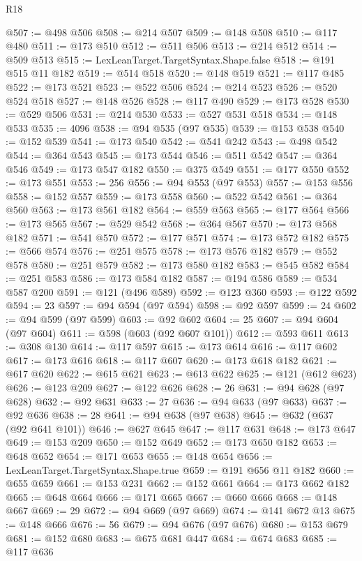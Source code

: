 \begin{lexlean}{R18}
\begin{coremodule}
@507 := @498 @506
@508 := @214 @507
@509 := @148 @508
@510 := @117 @480
@511 := @173 @510
@512 := @511 @506
@513 := @214 @512
@514 := @509 @513
@515 := LexLeanTarget.TargetSyntax.Shape.false
@518 := @191 @515 @11 @182
@519 := @514 @518
@520 := @148 @519
@521 := @117 @485
@522 := @173 @521
@523 := @522 @506
@524 := @214 @523
@526 := @520 @524 @518
@527 := @148 @526
@528 := @117 @490
@529 := @173 @528
@530 := @529 @506
@531 := @214 @530
@533 := @527 @531 @518
@534 := @148 @533
@535 := 4096
@538 := @94 @535 (@97 @535)
@539 := @153 @538
@540 := @152 @539
@541 := @173 @540
@542 := @541 @242
@543 := @498 @542
@544 := @364 @543
@545 := @173 @544
@546 := @511 @542
@547 := @364 @546
@549 := @173 @547 @182
@550 := @375 @549
@551 := @177 @550
@552 := @173 @551
@553 := 256
@556 := @94 @553 (@97 @553)
@557 := @153 @556
@558 := @152 @557
@559 := @173 @558
@560 := @522 @542
@561 := @364 @560
@563 := @173 @561 @182
@564 := @559 @563
@565 := @177 @564
@566 := @173 @565
@567 := @529 @542
@568 := @364 @567
@570 := @173 @568 @182
@571 := @541 @570
@572 := @177 @571
@574 := @173 @572 @182
@575 := @566 @574
@576 := @251 @575
@578 := @173 @576 @182
@579 := @552 @578
@580 := @251 @579
@582 := @173 @580 @182
@583 := @545 @582
@584 := @251 @583
@586 := @173 @584 @182
@587 := @194 @586
@589 := @534 @587 @200
@591 := @121 (@496 @589)
@592 := @123 @360
@593 := @122 @592
@594 := 23
@597 := @94 @594 (@97 @594)
@598 := @92 @597
@599 := 24
@602 := @94 @599 (@97 @599)
@603 := @92 @602
@604 := 25
@607 := @94 @604 (@97 @604)
@611 := @598 (@603 (@92 @607 @101))
@612 := @593 @611
@613 := @308 @130
@614 := @117 @597
@615 := @173 @614
@616 := @117 @602
@617 := @173 @616
@618 := @117 @607
@620 := @173 @618 @182
@621 := @617 @620
@622 := @615 @621
@623 := @613 @622
@625 := @121 (@612 @623)
@626 := @123 @209
@627 := @122 @626
@628 := 26
@631 := @94 @628 (@97 @628)
@632 := @92 @631
@633 := 27
@636 := @94 @633 (@97 @633)
@637 := @92 @636
@638 := 28
@641 := @94 @638 (@97 @638)
@645 := @632 (@637 (@92 @641 @101))
@646 := @627 @645
@647 := @117 @631
@648 := @173 @647
@649 := @153 @209
@650 := @152 @649
@652 := @173 @650 @182
@653 := @648 @652
@654 := @171 @653
@655 := @148 @654
@656 := LexLeanTarget.TargetSyntax.Shape.true
@659 := @191 @656 @11 @182
@660 := @655 @659
@661 := @153 @231
@662 := @152 @661
@664 := @173 @662 @182
@665 := @648 @664
@666 := @171 @665
@667 := @660 @666
@668 := @148 @667
@669 := 29
@672 := @94 @669 (@97 @669)
@674 := @141 @672 @13
@675 := @148 @666
@676 := 56
@679 := @94 @676 (@97 @676)
@680 := @153 @679
@681 := @152 @680
@683 := @675 @681 @447
@684 := @674 @683
@685 := @117 @636

\end{coremodule}
\end{lexlean}
